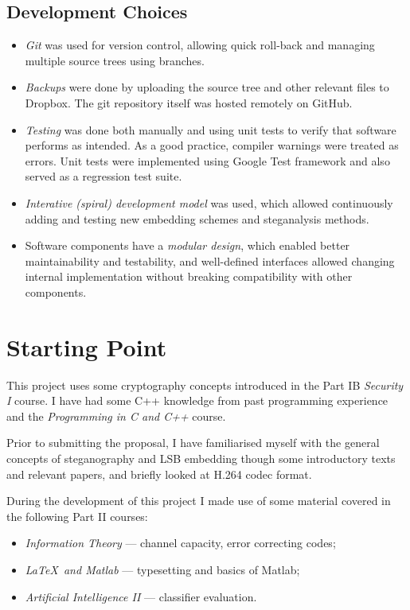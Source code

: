 \documentclass[12pt,british,twoside,notitlepage,usenames,dvipsnames,hypens,final]{report}
\numberwithin{equation}{section}
\numberwithin{figure}{section}
\begin{document}
\subsection{Development Choices}
\begin{itemize}
\item \emph{Git} was used for version control, allowing quick roll-back and managing multiple source trees using branches.
\item \emph{Backups} were done by uploading the source tree and other relevant files to Dropbox. The git repository itself was hosted remotely on GitHub.
\item \emph{Testing} was done both manually and using unit tests to verify that software performs as intended. As a good practice, compiler warnings were treated as errors. Unit tests were implemented using Google Test framework and also served as a regression test suite.
\item \emph{Interative (spiral) development model} was used, which allowed continuously adding and testing new embedding schemes and steganalysis methods.
\item Software components have a \emph{modular design}, which enabled better maintainability and testability, and well-defined interfaces allowed changing internal implementation without breaking compatibility with other components.
\end{itemize}

\section{Starting Point}
This project uses some cryptography concepts introduced in the Part IB \textit{Security I} course. I have had some C++ knowledge from past programming experience and the \textit{Programming in C and C++} course. 

Prior to submitting the proposal, I have familiarised myself with the general concepts of steganography and LSB embedding though some introductory texts and relevant papers, and briefly looked at H.264 codec format.

During the development of this project I made use of some material covered in the following Part II courses:
\begin{itemize}
\item \textit{Information Theory} --- channel capacity, error correcting codes;
\item \textit{\LaTeX~and Matlab} --- typesetting and basics of Matlab;
\item \textit{Artificial Intelligence II} --- classifier evaluation.
\end{itemize}
\end{document}
